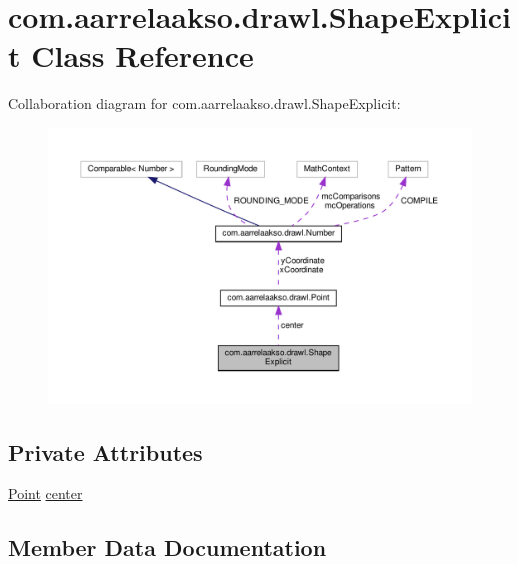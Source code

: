 \hypertarget{classcom_1_1aarrelaakso_1_1drawl_1_1_shape_explicit}{}\section{com.\+aarrelaakso.\+drawl.\+Shape\+Explicit Class Reference}
\label{classcom_1_1aarrelaakso_1_1drawl_1_1_shape_explicit}


Collaboration diagram for com.\+aarrelaakso.\+drawl.\+Shape\+Explicit\+:
\nopagebreak
\begin{figure}[H]
\begin{center}
\leavevmode
\includegraphics[width=350pt]{de/d31/classcom_1_1aarrelaakso_1_1drawl_1_1_shape_explicit__coll__graph}
\end{center}
\end{figure}
\subsection*{Private Attributes}
\begin{DoxyCompactItemize}
\item 
\hyperlink{classcom_1_1aarrelaakso_1_1drawl_1_1_point}{Point} \hyperlink{classcom_1_1aarrelaakso_1_1drawl_1_1_shape_explicit_aecea9209d9d5d5803acd7ff7b8ec9642}{center}
\end{DoxyCompactItemize}


\subsection{Member Data Documentation}
\mbox{\label{classcom_1_1aarrelaakso_1_1drawl_1_1_shape_explicit_aecea9209d9d5d5803acd7ff7b8ec9642}} 
